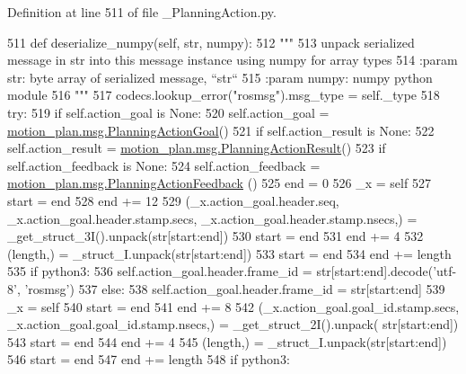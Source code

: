 Definition at line 511 of file \+\_\+\+Planning\+Action.\+py.


\begin{DoxyCode}
511   \textcolor{keyword}{def }deserialize\_numpy(self, str, numpy):
512     \textcolor{stringliteral}{"""}
513 \textcolor{stringliteral}{    unpack serialized message in str into this message instance using numpy for array types}
514 \textcolor{stringliteral}{    :param str: byte array of serialized message, ``str``}
515 \textcolor{stringliteral}{    :param numpy: numpy python module}
516 \textcolor{stringliteral}{    """}
517     codecs.lookup\_error(\textcolor{stringliteral}{"rosmsg"}).msg\_type = self.\_type
518     \textcolor{keywordflow}{try}:
519       \textcolor{keywordflow}{if} self.action\_goal \textcolor{keywordflow}{is} \textcolor{keywordtype}{None}:
520         self.action\_goal = \hyperlink{classmotion__plan_1_1msg_1_1__PlanningActionGoal_1_1PlanningActionGoal}{motion\_plan.msg.PlanningActionGoal}()
521       \textcolor{keywordflow}{if} self.action\_result \textcolor{keywordflow}{is} \textcolor{keywordtype}{None}:
522         self.action\_result = \hyperlink{classmotion__plan_1_1msg_1_1__PlanningActionResult_1_1PlanningActionResult}{motion\_plan.msg.PlanningActionResult}()
523       \textcolor{keywordflow}{if} self.action\_feedback \textcolor{keywordflow}{is} \textcolor{keywordtype}{None}:
524         self.action\_feedback = \hyperlink{classmotion__plan_1_1msg_1_1__PlanningActionFeedback_1_1PlanningActionFeedback}{motion\_plan.msg.PlanningActionFeedback}
      ()
525       end = 0
526       \_x = self
527       start = end
528       end += 12
529       (\_x.action\_goal.header.seq, \_x.action\_goal.header.stamp.secs, \_x.action\_goal.header.stamp.nsecs,) = 
      \_get\_struct\_3I().unpack(str[start:end])
530       start = end
531       end += 4
532       (length,) = \_struct\_I.unpack(str[start:end])
533       start = end
534       end += length
535       \textcolor{keywordflow}{if} python3:
536         self.action\_goal.header.frame\_id = str[start:end].decode(\textcolor{stringliteral}{'utf-8'}, \textcolor{stringliteral}{'rosmsg'})
537       \textcolor{keywordflow}{else}:
538         self.action\_goal.header.frame\_id = str[start:end]
539       \_x = self
540       start = end
541       end += 8
542       (\_x.action\_goal.goal\_id.stamp.secs, \_x.action\_goal.goal\_id.stamp.nsecs,) = \_get\_struct\_2I().unpack(
      str[start:end])
543       start = end
544       end += 4
545       (length,) = \_struct\_I.unpack(str[start:end])
546       start = end
547       end += length
548       \textcolor{keywordflow}{if} python3:

\end{DoxyCode}
